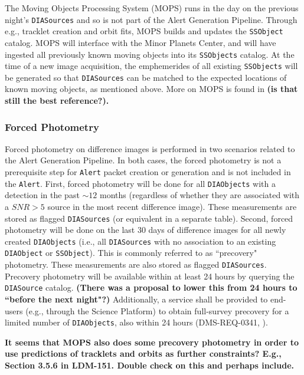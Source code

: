 The Moving Objects Processing System (MOPS) runs in the day on the previous night's {\tt DIASources} and so is not part of the Alert Generation Pipeline. Through e.g., tracklet creation and orbit fits, MOPS builds and updates the {\tt SSObject} catalog. MOPS will interface with the Minor Planets Center, and will have ingested all previously known moving objects into its {\tt SSObjects} catalog.  At the time of a new image acquisition, the emphemerides of all existing {\tt SSObjects} will be generated so that {\tt DIASources} can be matched to the expected locations of known moving objects, as mentioned above. More on MOPS is found in  {\bf (is that still the best reference?).}

\subsubsection{Forced Photometry}

Forced photometry on difference images is performed in two scenarios related to the Alert Generation Pipeline. In both cases, the forced photometry is not a prerequisite step for {\tt Alert} packet creation or generation and is not included in the {\tt Alert}. First, forced photometry will be done for all {\tt DIAObjects} with a detection in the past $\sim12$ months (regardless of whether they are associated with a $SNR>5$ source in the most recent difference image). These measurements are stored as flagged {\tt DIASources} (or equivalent in a separate table). Second, forced photometry will be done on the last 30 days of difference images for all newly created {\tt DIAObjects} (i.e., all {\tt DIASources} with no association to an existing {\tt DIAObject} or {\tt SSObject}). This is commonly referred to as ``precovery" photometry. These measurements are also stored as flagged {\tt DIASources}. Precovery photometry will be available within at least 24 hours by querying the {\tt DIASource} catalog. {\bf (There was a proposal to lower this from 24 hours to ``before the next night"?)}
Additionally, a service shall be provided to end-users (e.g., through the Science Platform) to obtain full-survey precovery for a limited number of {\tt DIAObjects}, also within 24 hours (DMS-REQ-0341, ). 

{\bf It seems that MOPS also does some precovery photometry in order to use predictions of tracklets and orbits as further constraints? E.g., Section 3.5.6 in LDM-151. Double check on this and perhaps include.}


